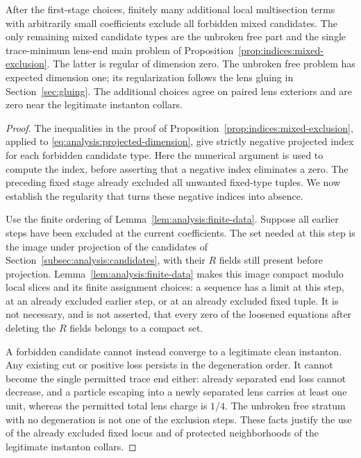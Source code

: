 \begin{proposition}
\label{prop:analysis:finite-induction}
After the first-stage choices, finitely many additional local
multisection terms with arbitrarily small coefficients exclude all
forbidden mixed candidates.  The only remaining mixed candidate types are
the unbroken free part and the single trace-minimum lens-end main
problem of Proposition~\ref{prop:indices:mixed-exclusion}.  The latter
is regular of dimension zero.  The unbroken free problem has expected
dimension one; its regularization follows the lens gluing in
Section~\ref{sec:gluing}.  The additional choices agree on paired lens
exteriors and are zero near the legitimate instanton collars.
\end{proposition}
\begin{proof}
The inequalities in the proof of
Proposition~\ref{prop:indices:mixed-exclusion}, applied to
\eqref{eq:analysis:projected-dimension}, give strictly negative
projected index for each forbidden candidate type.  Here the numerical
argument is used to compute the index, before asserting that a
negative index eliminates a zero.  The preceding fixed stage already
excluded all unwanted fixed-type tuples.  We now establish the
regularity that turns these negative indices into absence.

Use the finite ordering of Lemma~\ref{lem:analysis:finite-data}.
Suppose all earlier steps have been excluded at the current
coefficients.  The set needed at this step is the image under
projection of the candidates of Section~\ref{subsec:analysis:candidates},
with their $R$ fields still present before projection.
Lemma~\ref{lem:analysis:finite-data} makes this image compact modulo
local slices and its finite assignment choices: a sequence has a limit
at this step, at an already excluded earlier step, or at an already
excluded fixed tuple.  It is not necessary, and is not asserted, that
every zero of the loosened equations after deleting the $R$ fields
belongs to a compact set.

A forbidden candidate cannot instead converge to a legitimate clean
instanton.  Any existing cut or positive loss persists in the
degeneration order.  It cannot become the single permitted trace end
either: already separated end loss cannot decrease, and a particle
escaping into a newly separated lens carries at least one unit,
whereas the permitted total lens charge is $1/4$.  The unbroken free
stratum with no degeneration is not one of the exclusion steps.
These facts justify the use of the already excluded fixed locus and
of protected neighborhoods of the legitimate instanton collars.


\end{proof}
